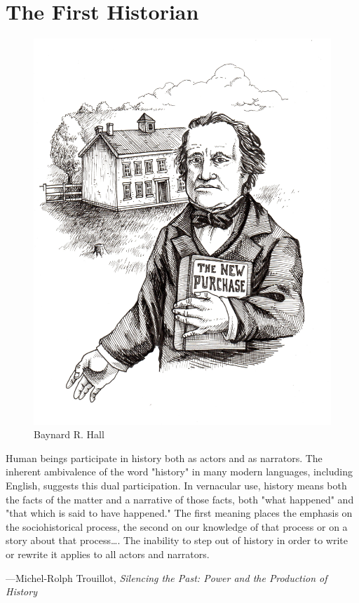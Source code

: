 \documentclass[
  american,
  letterpaper,
]{scrreprt}
\begin{document}

\chapter{The First Historian}\label{sec-two}

\begin{figure}[H]

{\centering \includegraphics[width=0.6\linewidth,height=\textheight,keepaspectratio]{images/miu2.jpeg}

}

\caption{Baynard R. Hall}

\end{figure}%

\epigraph{
Human beings participate in history both as actors and as narrators. The inherent ambivalence of the word "history" in many modern languages, including English, suggests this dual participation. In vernacular use, history means both the facts of the matter and a narrative of those facts, both "what happened" and "that which is said to have happened." The first meaning places the emphasis on the sociohistorical process, the second on our knowledge of that process or on a story about that process\ldots{}. The inability to step out of history in order to write or rewrite it applies to all actors and narrators.}
{
\parbox{.75\textwidth}{\raggedleft---Michel-Rolph Trouillot, \textit{Silencing the Past: Power and the Production of History}}
}
\end{document}
